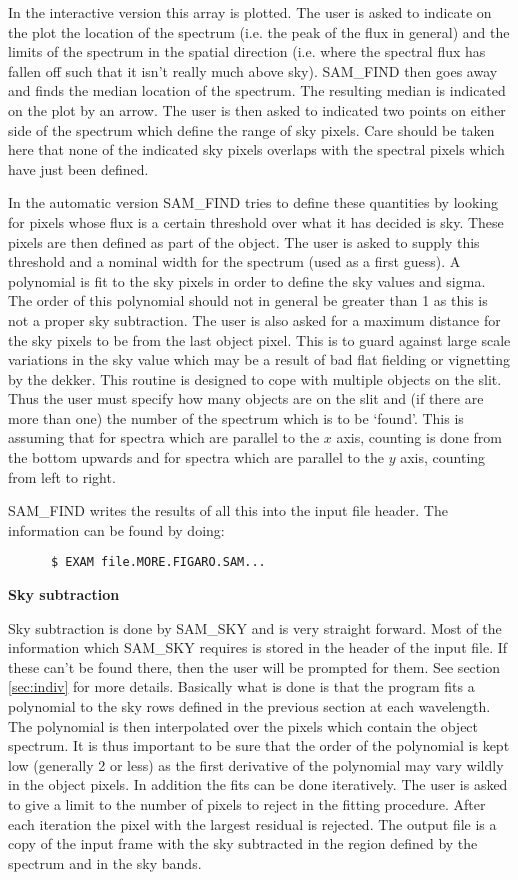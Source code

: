 In the interactive version this array is plotted.  The user is asked to
indicate on the plot the location of the spectrum (i.e. the peak of the  flux
in general) and the limits of the spectrum in the spatial direction  (i.e.
where the spectral flux has fallen off such that it isn't really much above
sky).  SAM\_FIND then goes away and finds the median location of the
spectrum.  The resulting median is indicated on the plot by an arrow. The user
is then asked to indicated two points on either side of the spectrum which
define the range of sky pixels.  Care should be taken here that  none of the
indicated sky pixels overlaps with the spectral pixels which have  just been
defined.

In the automatic version SAM\_FIND tries to define these quantities by
looking for pixels whose flux is a certain threshold over what it has decided
is sky.  These pixels are then defined as part of the object.  The user is
asked to supply this threshold and a nominal width for the spectrum (used as a
first guess). A polynomial is fit to the sky pixels in order to define the sky
values and sigma. The order of this polynomial should  not in general be
greater than 1 as this is not a proper sky subtraction. The user is also asked
for a maximum distance for the sky pixels to be from the last object pixel.
This is to guard against large scale variations in  the sky value which may be
a result of bad flat fielding or vignetting by  the dekker.  This routine is
designed to cope with multiple  objects on the slit.  Thus the user must
specify how many objects are on the slit and (if there are more than one) the
number of the spectrum which  is to be `found'.  This is assuming that for
spectra which are parallel to the $x$ axis, counting is done from the bottom
upwards and for spectra which are parallel to the $y$ axis, counting from left
to right.

SAM\_FIND writes the results of all this into the input file header.  The
information can be found by doing:

\begin{verbatim}
      $ EXAM file.MORE.FIGARO.SAM...
\end{verbatim}

{\bf Sky subtraction}

Sky subtraction is done by SAM\_SKY and is very straight forward.  Most of
the information which SAM\_SKY requires is stored in the header of the  input
file.  If these can't be found there, then the user will be prompted  for
them. See section \ref{sec:indiv} for more details.  Basically what is  done
is that the program fits a polynomial to the sky rows defined in the  previous
section at each wavelength.  The polynomial is then interpolated  over the
pixels which contain the object spectrum.  It is thus important to be  sure
that the order of the polynomial is kept low (generally 2 or less) as the
first derivative of the polynomial may vary wildly in the object  pixels.  In
addition the fits can be done iteratively. The user is  asked to give a limit
to the number of pixels to reject in the fitting  procedure.  After each
iteration the pixel with the largest residual is  rejected.  The output file
is a copy of the input frame with the sky  subtracted in the region defined by
the spectrum and in the sky bands.

